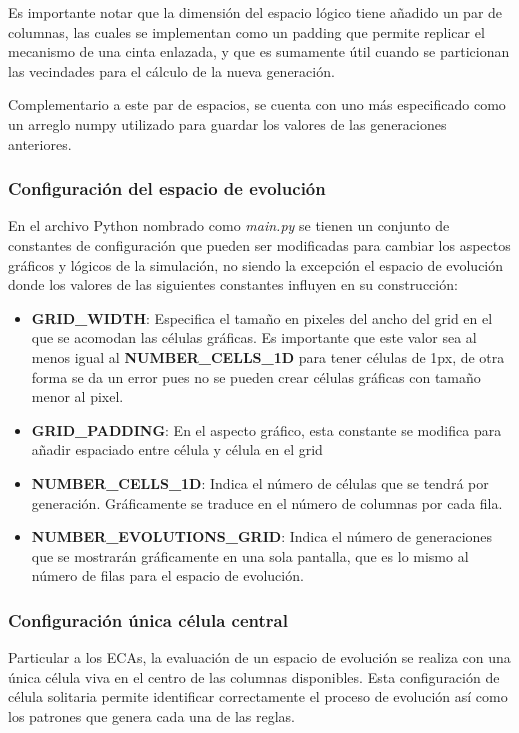 \documentclass[]{article}
\begin{document}
			\hfill\break
			\justifying
			Es importante notar que la dimensión del espacio lógico tiene añadido un par de columnas, las cuales se implementan como un padding que permite replicar el mecanismo de una cinta enlazada, y que es sumamente útil cuando se particionan las vecindades para el cálculo de la nueva generación.
			
			\hfill\break
			\justifying
			Complementario a este par de espacios, se cuenta con uno más especificado como un arreglo numpy utilizado para guardar los valores de las generaciones anteriores.
			
			\subsubsection{Configuración del espacio de evolución}
			\justifying
			En el archivo Python nombrado como \textit{main.py} se tienen un conjunto de constantes de configuración que pueden ser modificadas para cambiar los aspectos gráficos y lógicos de la simulación, no siendo la excepción el espacio de evolución donde los valores de las siguientes constantes influyen en su construcción:
			\begin{itemize}	
				\item \textbf{GRID\_WIDTH}: Especifica el tamaño en pixeles del ancho del grid en el que se acomodan las células gráficas. Es importante que este valor sea al menos igual al \textbf{NUMBER\_CELLS\_1D} para tener células de 1px, de otra forma se da un error pues no se pueden crear células gráficas con tamaño menor al pixel.
				
				\item \textbf{GRID\_PADDING}: En el aspecto gráfico, esta constante se modifica para añadir espaciado entre célula y célula en el grid
				
				\item \textbf{NUMBER\_CELLS\_1D}: Indica el número de células que se tendrá por generación. Gráficamente se traduce en el número de columnas por cada fila.
				
				\item \textbf{NUMBER\_EVOLUTIONS\_GRID}: Indica el número de generaciones que se mostrarán gráficamente en una sola pantalla, que es lo mismo al número de filas para el espacio de evolución.
			
			\end{itemize}
			
			\subsubsection{Configuración única célula central}
			\justifying
			Particular a los ECAs, la evaluación de un espacio de evolución se realiza con una única célula viva en el centro de las columnas disponibles. Esta configuración de célula solitaria permite identificar correctamente el proceso de evolución así como los patrones que genera cada una de las reglas.
			
\end{document}
